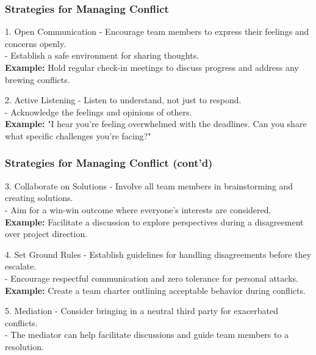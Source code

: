 \documentclass[aspectratio=169]{beamer}
\begin{document}
\begin{frame}[fragile]
    \frametitle{Strategies for Managing Conflict}
    \begin{block}{1. Open Communication}
        - Encourage team members to express their feelings and concerns openly. \\
        - Establish a safe environment for sharing thoughts. \\
        \textbf{Example:} Hold regular check-in meetings to discuss progress and address any brewing conflicts.
    \end{block}

    \begin{block}{2. Active Listening}
        - Listen to understand, not just to respond. \\
        - Acknowledge the feelings and opinions of others. \\
        \textbf{Example:} "I hear you’re feeling overwhelmed with the deadlines. Can you share what specific challenges you’re facing?"
    \end{block}
\end{frame}

\begin{frame}[fragile]
    \frametitle{Strategies for Managing Conflict (cont'd)}
    \begin{block}{3. Collaborate on Solutions}
        - Involve all team members in brainstorming and creating solutions. \\
        - Aim for a win-win outcome where everyone's interests are considered. \\
        \textbf{Example:} Facilitate a discussion to explore perspectives during a disagreement over project direction.
    \end{block}

    \begin{block}{4. Set Ground Rules}
        - Establish guidelines for handling disagreements before they escalate. \\
        - Encourage respectful communication and zero tolerance for personal attacks. \\
        \textbf{Example:} Create a team charter outlining acceptable behavior during conflicts.
    \end{block}

    \begin{block}{5. Mediation}
        - Consider bringing in a neutral third party for exacerbated conflicts. \\
        - The mediator can help facilitate discussions and guide team members to a resolution.
    \end{block}
\end{frame}
\end{document}
